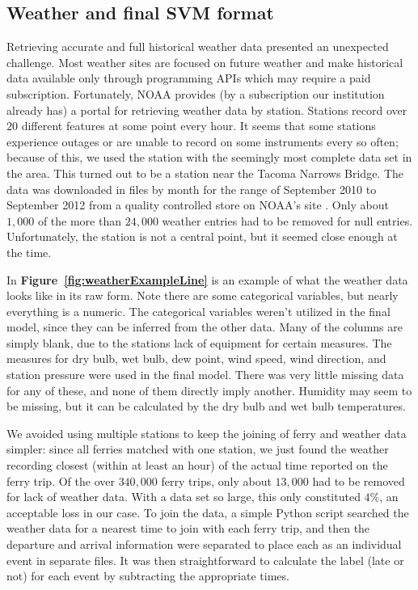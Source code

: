 \documentclass[11pt]{article} %
\begin{document}
\subsection{Weather and final SVM format}
\label{sec:data_origins}
Retrieving accurate and full historical weather data presented an unexpected 
challenge. Most weather sites are focused on future weather and make historical
data available only through programming APIs which may require a paid subscription.
Fortunately, NOAA provides (by a subscription our institution already has) a portal 
for retrieving weather data
by station. Stations record over $20$ different features at some point every hour.
It seems that some stations experience outages or are unable to record on some
instruments every so often; because of this, we used the station with the seemingly
most complete data set in the area. This turned out to be a station near the 
Tacoma Narrows Bridge. The data was downloaded in files by month for the range of
September 2010 to September 2012 from a quality controlled store on NOAA's 
site \cite{noaaWeather}. Only about $1,000$ of the more than $24,000$ weather 
entries had to be removed for null entries.  Unfortunately, 
the station is not a central point, but it seemed close enough at the time. 

In \textbf{Figure~\ref{fig:weatherExampleLine}} is an example of what the weather
data looks like in its raw form. Note there are some categorical variables, but
nearly everything is a numeric. The categorical variables weren't utilized in the
final model, since they can be inferred from the other data. Many of the columns
are simply blank, due to the stations lack of equipment for certain measures. 
The measures for dry bulb, wet bulb, dew point, wind speed, wind direction, and
station pressure were used in the final model. There was very little missing data
for any of these, and none of them directly imply another. Humidity may seem to 
be missing, but it can be calculated by the dry bulb and wet bulb temperatures.

We avoided using multiple stations to keep the joining of ferry and weather 
data simpler: since all ferries matched with one station, we just found the 
weather recording closest (within at least an hour) of the actual time reported
on the ferry trip. Of the over $340,000$ ferry trips, only about $13,000$ had to 
be removed for lack of weather data.  With a data set so large, this only 
constituted $4\%$, an acceptable loss in our case. To join the data, a simple
Python script searched the weather data for a nearest time to join with each
ferry trip, and then the departure and arrival information were separated to
place each as an individual event in separate files. It was then straightforward
to calculate the label (late or not) for each event by subtracting the appropriate
times.
\end{document}
